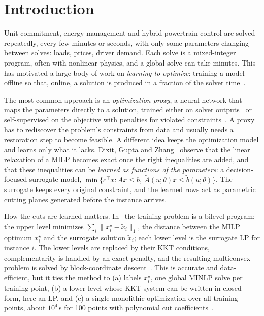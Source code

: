 \documentclass[10pt]{article}
\begin{document}
\section{Introduction}
\label{sec:intro}

Unit commitment, energy management and hybrid-powertrain control are solved repeatedly, every few minutes or seconds, with only some parameters changing between solves: loads, prices, driver demand.
Each solve is a mixed-integer program, often with nonlinear physics, and a global solve can take minutes.
This has motivated a large body of work on \emph{learning to optimize}: training a model offline so that, online, a solution is produced in a fraction of the solver time~\citep{bengio2021tour,kotary2021survey}.

The most common approach is an \emph{optimization proxy}, a neural network that maps the parameters directly to a solution, trained either on solver outputs~\citep{fioretto2020acopf,bertsimas2021voice} or self-supervised on the objective with penalties for violated constraints~\citep{donti2021dc3,park2023pdl,tang2024l2ominlp,boldocky2025midpc}.
A proxy has to rediscover the problem's constraints from data and usually needs a restoration step to become feasible.
A different idea keeps the optimization model and learns only what it lacks.
Dixit, Gupta and Zhang~\citep{dixit2025dfsm} observe that the linear relaxation of a MILP becomes exact once the right inequalities are added, and that these inequalities can be \emph{learned as functions of the parameters}: a decision-focused surrogate model, $\min\{c^\top x : Ax\le b,\ \tilde A(u;\theta)x\le\tilde b(u;\theta)\}$.
The surrogate keeps every original constraint, and the learned rows act as parametric cutting planes generated before the instance arrives.

How the cuts are learned matters.
In~\citep{dixit2025dfsm} the training problem is a bilevel program: the upper level minimizes $\sum_i\|x_i^\star-\tilde x_i\|_1$, the distance between the MILP optimum $x_i^\star$ and the surrogate solution $\tilde x_i$; each lower level is the surrogate LP for instance $i$.
The lower levels are replaced by their KKT conditions, complementarity is handled by an exact penalty, and the resulting multiconvex problem is solved by block-coordinate descent~\citep{gupta2023pbcd}.
This is accurate and data-efficient, but it ties the method to (a) labels $x_i^\star$, one global MINLP solve per training point, (b) a lower level whose KKT system can be written in closed form, here an LP, and (c) a single monolithic optimization over all training points, about $10^4$\,s for 100 points with polynomial cut coefficients~\citep{dixit2025dfsm}.
\end{document}
